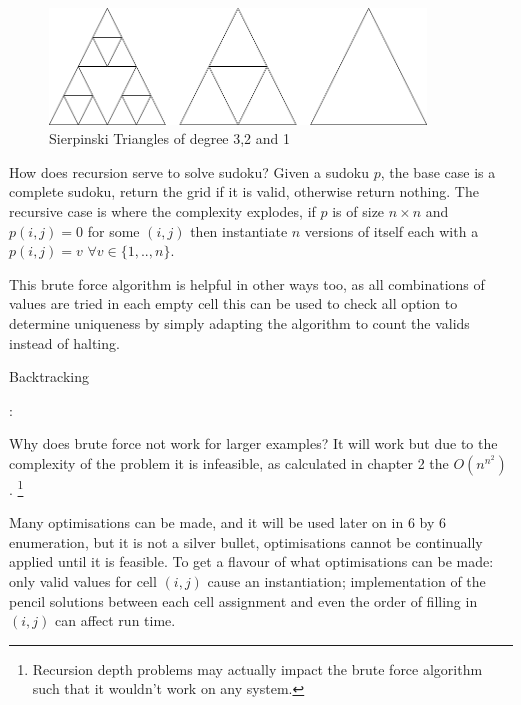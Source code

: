 \documentclass[a4paper,11pt]{report}
\newcounter{row}
\newcounter{col}
\begin{document}
\begin{figure}[!h]
\begin{center}
\includegraphics[width=100mm]{figures/SiepTri.png}
\end{center}
\caption{Sierpinski Triangles of degree 3,2 and 1\label{fig:sieptri}}
\end{figure}

How does recursion serve to solve sudoku? Given a sudoku $p$, the base case is a complete sudoku, return the grid if it is valid, otherwise return nothing. The recursive case is where the complexity explodes, if $p$ is of size $n\times n$ and $p(i,j)=0$ for some $(i,j)$ then instantiate $n$ versions of itself each with a $p(i,j)=v$ $\forall v \in \{1,..,n\}$. 

This brute force algorithm is helpful in other ways too, as all combinations of values are tried in each empty cell this can be used to check all option to determine uniqueness by simply adapting the algorithm to count the valids instead of halting.

\begin{algorithm}
\caption{Backtracking}
\begin{algorithmic}
\Else:
\EndIf
{}
\EndIf
\EndIf
\EndFor
\EndFor
{}
\EndProcedure 
\end{algorithmic}
\end{algorithm}

Why does brute force not work for larger examples? It will work but due to the complexity of the problem it is infeasible, as calculated in chapter 2 the $O(n^{n^2})$ . \footnote{Recursion depth problems may actually impact the brute force algorithm such that it wouldn’t work on any system.}

Many optimisations can be made, and it will be used later on in 6 by 6 enumeration, but it is not a silver bullet, optimisations cannot be continually applied until it is feasible. To get a flavour of what optimisations can be made: only valid values for cell $(i,j)$ cause an instantiation; implementation of the pencil solutions between each cell assignment and even the order of filling in $(i,j)$ can affect run time.
\end{document}

